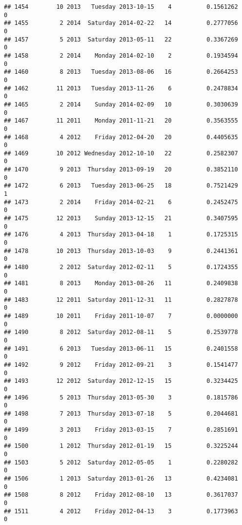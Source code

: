 \documentclass[
]{article}
\begin{document}
\begin{verbatim}
## 1454        10 2013   Tuesday 2013-10-15    4          0.1561262             0
## 1455         2 2014  Saturday 2014-02-22   14          0.2777056             0
## 1457         5 2013  Saturday 2013-05-11   22          0.3367269             0
## 1458         2 2014    Monday 2014-02-10    2          0.1934594             0
## 1460         8 2013   Tuesday 2013-08-06   16          0.2664253             0
## 1462        11 2013   Tuesday 2013-11-26    6          0.2478834             0
## 1465         2 2014    Sunday 2014-02-09   10          0.3030639             0
## 1467        11 2011    Monday 2011-11-21   20          0.3563555             0
## 1468         4 2012    Friday 2012-04-20   20          0.4405635             0
## 1469        10 2012 Wednesday 2012-10-10   22          0.2582307             0
## 1470         9 2013  Thursday 2013-09-19   20          0.3852110             0
## 1472         6 2013   Tuesday 2013-06-25   18          0.7521429             1
## 1473         2 2014    Friday 2014-02-21    6          0.2452475             0
## 1475        12 2013    Sunday 2013-12-15   21          0.3407595             0
## 1476         4 2013  Thursday 2013-04-18    1          0.1725315             0
## 1478        10 2013  Thursday 2013-10-03    9          0.2441361             0
## 1480         2 2012  Saturday 2012-02-11    5          0.1724355             0
## 1481         8 2013    Monday 2013-08-26   11          0.2409838             0
## 1483        12 2011  Saturday 2011-12-31   11          0.2827878             0
## 1489        10 2011    Friday 2011-10-07    7          0.0000000             0
## 1490         8 2012  Saturday 2012-08-11    5          0.2539778             0
## 1491         6 2013   Tuesday 2013-06-11   15          0.2401558             0
## 1492         9 2012    Friday 2012-09-21    3          0.1541477             0
## 1493        12 2012  Saturday 2012-12-15   15          0.3234425             0
## 1496         5 2013  Thursday 2013-05-30    3          0.1815786             0
## 1498         7 2013  Thursday 2013-07-18    5          0.2044681             0
## 1499         3 2013    Friday 2013-03-15    7          0.2851691             0
## 1500         1 2012  Thursday 2012-01-19   15          0.3225244             0
## 1503         5 2012  Saturday 2012-05-05    1          0.2280282             0
## 1506         1 2013  Saturday 2013-01-26   13          0.4234081             0
## 1508         8 2012    Friday 2012-08-10   13          0.3617037             0
## 1511         4 2012    Friday 2012-04-13    3          0.1773963             0

\end{verbatim}
\end{document}

